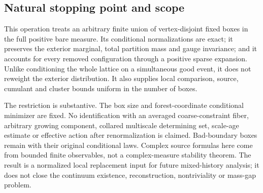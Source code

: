 \subsection{Natural stopping point and scope}
\label{nbr-scope}

This operation treats an arbitrary finite union of vertex-disjoint
fixed boxes in the full positive bare measure. Its conditional
normalizations are exact; it preserves the exterior marginal, total
partition mass and gauge invariance; and it accounts for every removed
configuration through a positive sparse expansion. Unlike conditioning
the whole lattice on a simultaneous good event, it does not reweight
the exterior distribution. It also supplies local comparison, source,
cumulant and cluster bounds uniform in the number of boxes.

The restriction is substantive. The box size and forest-coordinate
conditional minimizer are fixed. No identification with an averaged
coarse-constraint fiber, arbitrary growing component, collared
multiscale determining set, scale-age estimate or effective action
after renormalization is claimed. Bad-boundary boxes remain with their
original conditional laws. Complex source formulas here come from
bounded finite observables, not a complex-measure stability theorem.
The result is a normalized local replacement input for future
mixed-history analysis; it does not close the continuum existence,
reconstruction, nontriviality or mass-gap problem.
